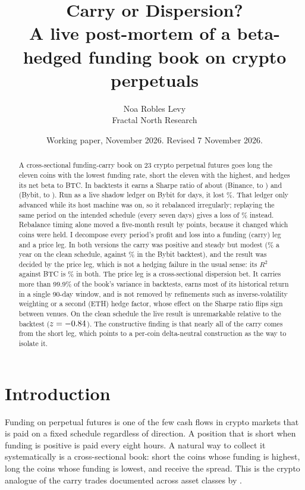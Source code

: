 \documentclass[11pt,a4paper]{article}
\title{\textbf{Carry or Dispersion?}\\[0.3em]
\large A live post-mortem of a beta-hedged funding book on crypto perpetuals}
\author{Noa Robles Levy\\[0.2em]
\small Fractal North Research}
\date{\small Working paper, November 2026. Revised 7 November 2026.}
\begin{document}
\maketitle

\begin{abstract}
\noindent
A cross-sectional funding-carry book on 23 crypto perpetual futures goes long the
eleven coins with the lowest funding rate, short the eleven with the highest, and
hedges its net beta to BTC. In backtests it earns a Sharpe ratio of about
\BnBaseSharpe{} (Binance, \BnStart{} to \BnEnd) and \ByBaseSharpe{} (Bybit,
\ByStart{} to \ByEnd). Run as a live shadow ledger on Bybit for \LiveDays{} days, it
lost \LiveLoss\%. That ledger only advanced while its host machine was on, so it
rebalanced irregularly; replaying the same period on the intended schedule (every
seven days) gives a loss of \CleanLoss\% instead. Rebalance timing alone moved a
five-month result by \CleanGap{} points, because it changed which coins were held. I
decompose every period's profit and loss into a funding (carry) leg and a price leg.
In both versions the carry was positive and steady but modest (\CleanCarryAnn\% a
year on the clean schedule, against \ByBaseCarry\% in the Bybit backtest), and the
result was decided by the price leg, which is not a hedging failure in the usual sense:
its $R^2$ against BTC is \LiveRsqBtc\% in both. The price leg is a cross-sectional
dispersion bet. It carries more than 99.9\% of the book's variance in backtests, earns
most of its historical return in a single 90-day window, and is not removed by
refinements such as inverse-volatility weighting or a second (ETH) hedge factor, whose
effect on the Sharpe ratio flips sign between venues. On the clean schedule the live
result is unremarkable relative to the backtest ($z=-0.84$). The constructive finding
is that nearly all of the carry comes from the short leg, which points to a per-coin
delta-neutral construction as the way to isolate it.
\end{abstract}

\section{Introduction}

Funding on perpetual futures is one of the few cash flows in crypto markets that is
paid on a fixed schedule regardless of direction. A position that is short when
funding is positive is paid every eight hours. A natural way to collect it
systematically is a cross-sectional book: short the coins whose funding is highest,
long the coins whose funding is lowest, and receive the spread. This is the crypto
analogue of the carry trades documented across asset classes by
\citet{koijen2018carry}.
\end{document}
